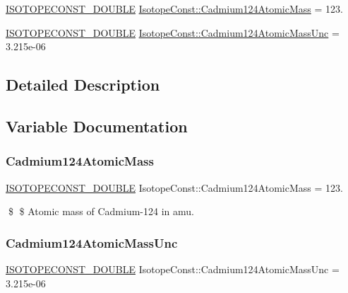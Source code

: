 \begin{DoxyCompactItemize}
\item 
\mbox{\hyperlink{group___isotope_const-_macros_ga8f45a7272ce02c0b4c65c44636ed719a}{I\+S\+O\+T\+O\+P\+E\+C\+O\+N\+S\+T\+\_\+\+D\+O\+U\+B\+LE}} \mbox{\hyperlink{group___isotope_const-_cadmium-_cd124_ga17922b8bf361b4e166dd2166125a6e98}{Isotope\+Const\+::\+Cadmium124\+Atomic\+Mass}} = 123.
\item 
\mbox{\hyperlink{group___isotope_const-_macros_ga8f45a7272ce02c0b4c65c44636ed719a}{I\+S\+O\+T\+O\+P\+E\+C\+O\+N\+S\+T\+\_\+\+D\+O\+U\+B\+LE}} \mbox{\hyperlink{group___isotope_const-_cadmium-_cd124_ga8a712875f58f834ba82b7aa91690ea9c}{Isotope\+Const\+::\+Cadmium124\+Atomic\+Mass\+Unc}} = 3.\+215e-\/06
\end{DoxyCompactItemize}


\subsection{Detailed Description}


\subsection{Variable Documentation}
\mbox{\label{group___isotope_const-_cadmium-_cd124_ga17922b8bf361b4e166dd2166125a6e98}} 
\subsubsection{\texorpdfstring{Cadmium124\+Atomic\+Mass}{Cadmium124AtomicMass}}
{\footnotesize\ttfamily \mbox{\hyperlink{group___isotope_const-_macros_ga8f45a7272ce02c0b4c65c44636ed719a}{I\+S\+O\+T\+O\+P\+E\+C\+O\+N\+S\+T\+\_\+\+D\+O\+U\+B\+LE}} Isotope\+Const\+::\+Cadmium124\+Atomic\+Mass = 123.}

\$ \$ Atomic mass of Cadmium-\/124 in amu. \mbox{\label{group___isotope_const-_cadmium-_cd124_ga8a712875f58f834ba82b7aa91690ea9c}} 
\subsubsection{\texorpdfstring{Cadmium124\+Atomic\+Mass\+Unc}{Cadmium124AtomicMassUnc}}
{\footnotesize\ttfamily \mbox{\hyperlink{group___isotope_const-_macros_ga8f45a7272ce02c0b4c65c44636ed719a}{I\+S\+O\+T\+O\+P\+E\+C\+O\+N\+S\+T\+\_\+\+D\+O\+U\+B\+LE}} Isotope\+Const\+::\+Cadmium124\+Atomic\+Mass\+Unc = 3.\+215e-\/06}

